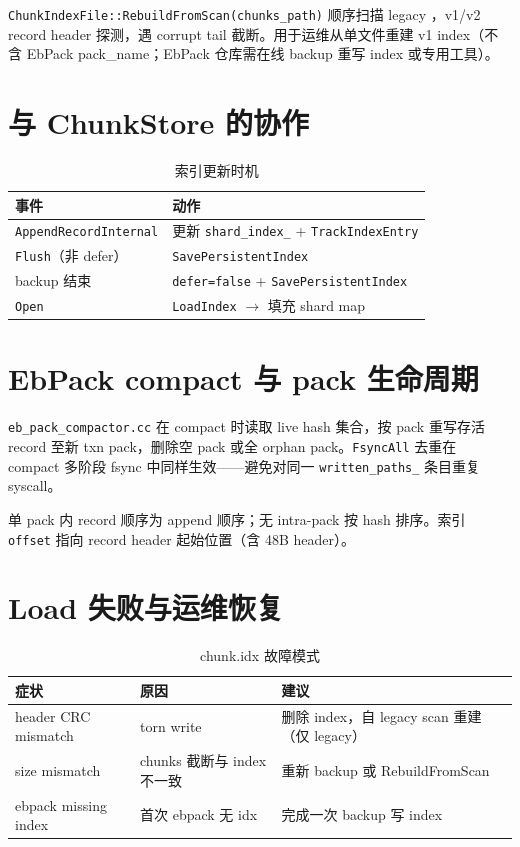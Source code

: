 \texttt{ChunkIndexFile::RebuildFromScan(chunks\_path)} 顺序扫描 legacy ，v1/v2 record header 探测，遇 corrupt tail 截断。用于运维从单文件重建 v1 index（不含 EbPack pack\_name；EbPack 仓库需在线 backup 重写 index 或专用工具）。

\section{与 ChunkStore 的协作}

\begin{table}[htbp]
\centering
\caption{索引更新时机}
\begin{tabular}{@{}ll@{}}
\toprule
事件 & 动作 \\
\midrule
\texttt{AppendRecordInternal} & 更新 \texttt{shard\_index\_} + \texttt{TrackIndexEntry} \\
\texttt{Flush}（非 defer） & \texttt{SavePersistentIndex} \\
backup 结束 & \texttt{defer=false} + \texttt{SavePersistentIndex} \\
\texttt{Open} & \texttt{LoadIndex} $\rightarrow$ 填充 shard map \\
\bottomrule
\end{tabular}
\end{table}

\section{EbPack compact 与 pack 生命周期}

\texttt{eb\_pack\_compactor.cc} 在 compact 时读取 live hash 集合，按 pack 重写存活 record 至新 txn pack，删除空 pack 或全 orphan pack。\texttt{FsyncAll} 去重在 compact 多阶段 fsync 中同样生效——避免对同一 \texttt{written\_paths\_} 条目重复 syscall。

单 pack 内 record 顺序为 append 顺序；无 intra-pack 按 hash 排序。索引 \texttt{offset} 指向 record header 起始位置（含 48B header）。

\section{Load 失败与运维恢复}

\begin{table}[htbp]
\centering
\caption{chunk.idx 故障模式}
\begin{tabular}{@{}llp{6cm}@{}}
\toprule
症状 & 原因 & 建议 \\
\midrule
header CRC mismatch &  torn write & 删除 index，自 legacy scan 重建（仅 legacy） \\
size mismatch & chunks 截断与 index 不一致 & 重新 backup 或 RebuildFromScan \\
ebpack missing index & 首次 ebpack 无 idx & 完成一次 backup 写 index \\
\bottomrule
\end{tabular}
\end{table}

